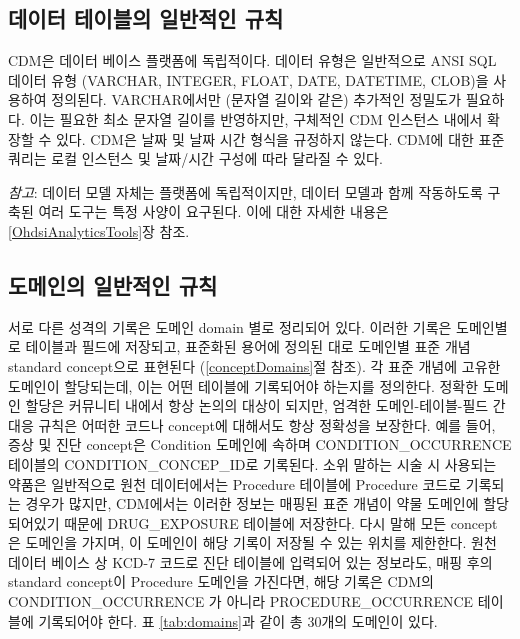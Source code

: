 \documentclass[10.5pt]{book}
\theoremstyle{definition}
\theoremstyle{definition}
\theoremstyle{definition}
\theoremstyle{remark}
\begin{document}
\subsection{데이터 테이블의 일반적인 규칙}\label{---}

CDM은 데이터 베이스 플랫폼에 독립적이다. 데이터 유형은 일반적으로 ANSI
SQL 데이터 유형 (VARCHAR, INTEGER, FLOAT, DATE, DATETIME, CLOB)을
사용하여 정의된다. VARCHAR에서만 (문자열 길이와 같은) 추가적인 정밀도가
필요하다. 이는 필요한 최소 문자열 길이를 반영하지만, 구체적인 CDM
인스턴스 내에서 확장할 수 있다. CDM은 날짜 및 날짜 시간 형식을 규정하지
않는다. CDM에 대한 표준 쿼리는 로컬 인스턴스 및 날짜/시간 구성에 따라
달라질 수 있다.

\emph{참고}: 데이터 모델 자체는 플랫폼에 독립적이지만, 데이터 모델과
함께 작동하도록 구축된 여러 도구는 특정 사양이 요구된다. 이에 대한
자세한 내용은 \ref{OhdsiAnalyticsTools}장 참조.

\subsection{도메인의 일반적인 규칙}\label{domains}

서로 다른 성격의 기록은 도메인 domain 별로 정리되어 있다. 이러한 기록은
도메인별로 테이블과 필드에 저장되고, 표준화된 용어에 정의된 대로
도메인별 표준 개념 standard concept으로 표현된다 (\ref{conceptDomains}절
참조). 각 표준 개념에 고유한 도메인이 할당되는데, 이는 어떤 테이블에
기록되어야 하는지를 정의한다. 정확한 도메인 할당은 커뮤니티 내에서 항상
논의의 대상이 되지만, 엄격한 도메인-테이블-필드 간 대응 규칙은 어떠한
코드나 concept에 대해서도 항상 정확성을 보장한다. 예를 들어, 증상 및
진단 concept은 Condition 도메인에 속하며 CONDITION\_OCCURRENCE 테이블의
CONDITION\_CONCEP\_ID로 기록된다. 소위 말하는 시술 시 사용되는 약품은
일반적으로 원천 데이터에서는 Procedure 테이블에 Procedure 코드로
기록되는 경우가 많지만, CDM에서는 이러한 정보는 매핑된 표준 개념이 약물
도메인에 할당되어있기 때문에 DRUG\_EXPOSURE 테이블에 저장한다. 다시 말해
모든 concept 은 도메인을 가지며, 이 도메인이 해당 기록이 저장될 수 있는
위치를 제한한다. 원천 데이터 베이스 상 KCD-7 코드로 진단 테이블에
입력되어 있는 정보라도, 매핑 후의 standard concept이 Procedure 도메인을
가진다면, 해당 기록은 CDM의 CONDITION\_OCCURRENCE 가 아니라
PROCEDURE\_OCCURRENCE 테이블에 기록되어야 한다. 표 \ref{tab:domains}과
같이 총 30개의 도메인이 있다.
\end{document}
